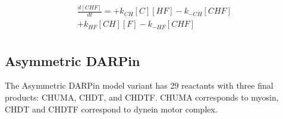 \begin{equation}
\begin{split}
\frac{d[CHF]}{dt} =   + k_{CH}[C][HF]  - k_{-CH}[CHF]     \\%
                      + k_{HF}[CH][F]  - k_{-HF}[CHF]     \\%
\end{split}
\end{equation}

\subsection{Asymmetric DARPin}

The Asymmetric DARPin model variant has 29 reactants with three final products: CHUMA, CHDT, and CHDTF. CHUMA corresponds to myosin, CHDT and CHDTF correspond to dynein motor complex.

